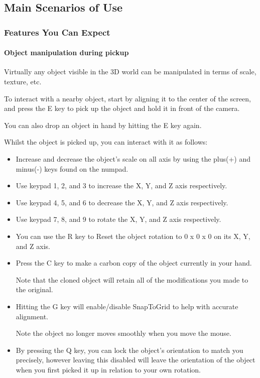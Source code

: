 \documentclass{article}
\begin{document}
	\subsection{Main Scenarios of Use}

		\subsubsection{Features You Can Expect}

			\paragraph{Object manipulation during pickup}

			Virtually any object visible in the 3D world can be manipulated in terms of scale, texture, etc.

			To interact with a nearby object, start by aligning it to the center of the screen, and press the E key to pick up the object and hold it in front of the camera.

			You can also drop an object in hand by hitting the E key again.

			Whilst the object is picked up, you can interact with it as follows:

			\begin{itemize}

				\item Increase and decrease the object's scale on all axis by using the plus(+) and minus(-) keys found on the numpad.

				\item Use keypad 1, 2, and 3 to increase the X, Y, and Z axis respectively.

				\item Use keypad 4, 5, and 6 to decrease the X, Y, and Z axis respectively.

				\item Use keypad 7, 8, and 9 to rotate the X, Y, and Z axis respectively.

				\item You can use the R key to Reset the object rotation to 0 x 0 x 0 on its X, Y, and Z axis.

				\item Press the C key to make a carbon copy of the object currently in your hand.

				Note that the cloned object will retain all of the modifications you made to the original.

				\item Hitting the G key will enable/disable SnapToGrid to help with accurate alignment.

				Note the object no longer moves smoothly when you move the mouse.

				\item By pressing the Q key, you can lock the object's orientation to match you precisely, however leaving this disabled will leave the orientation of the object when you first picked it up in relation to your own rotation.

			\end{itemize}
\end{document}
